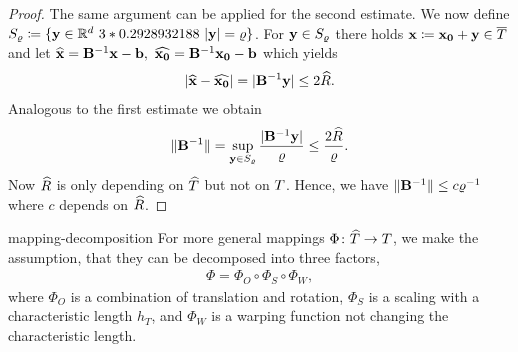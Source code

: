 \begin{proof}
  The same argument can be applied for the second estimate.
  We now define $S_\varrho\coloneqq \{\mathbf y\in\mathbb R^d~3*0.2928932188~\lvert\mathbf y\rvert=\varrho \}$.
  For $\mathbf y\in S_\varrho$ there holds $\mathbf x\coloneqq\mathbf{x_0}+\mathbf y\in\overline{T}$
  and let $\widehat{\mathbf x}=\mathbf B^{-1}\mathbf x-\mathbf b,~\widehat{\mathbf{x_0}}=\mathbf B^{-1} \mathbf{x_0} - \mathbf b$ which yields
  \begin{align*}
    \lvert\widehat{\mathbf x} - \widehat{\mathbf{x_0}}\rvert = \lvert\mathbf B^{-1} \mathbf y\rvert\leq 2\widehat{R}.
  \end{align*}
  Analogous to the first estimate we obtain
  \begin{align*}
    \lVert\mathbf B^{-1}\rVert = \sup_{\mathbf y\in S_\varrho} \frac{\lvert\mathbf B^{-1} \mathbf y\rvert}{\varrho}
    \leq \frac{2\widehat{R}}{\varrho}.
  \end{align*}
  Now $\widehat{R}$ is only depending on $\widehat{T}$ but not on $T$.
  Hence, we have $\lVert\mathbf B^{-1}\rVert\leq c\varrho^{-1}$ where $c$ depends
  on $\widehat{R}$.
\end{proof}

\begin{Assumption}{mapping-decomposition}
  For more general mappings $\Phi\colon \widehat{T}\to T$, we
  make the assumption, that they can be decomposed into three factors,
  \begin{gather}
    \Phi = \Phi_O \circ \Phi_S \circ \Phi_W,
  \end{gather}
  where $\Phi_O$ is a combination of translation and rotation,
  $\Phi_S$ is a scaling with a characteristic length $h_T$, and
  $\Phi_W$ is a warping function not changing the characteristic length.
\end{Assumption}

